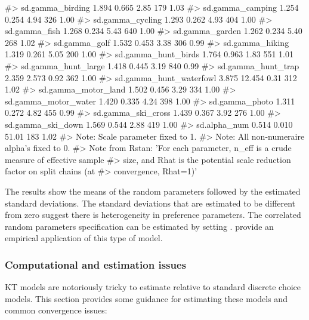 \begin{example}
#> sd.gamma_birding           1.894   0.665   2.85   179 1.03
#> sd.gamma_camping           1.254   0.254   4.94   326 1.00
#> sd.gamma_cycling           1.293   0.262   4.93   404 1.00
#> sd.gamma_fish              1.268   0.234   5.43   640 1.00
#> sd.gamma_garden            1.262   0.234   5.40   268 1.02
#> sd.gamma_golf              1.532   0.453   3.38   306 0.99
#> sd.gamma_hiking            1.319   0.261   5.05   200 1.00
#> sd.gamma_hunt_birds        1.764   0.963   1.83   551 1.01
#> sd.gamma_hunt_large        1.418   0.445   3.19   840 0.99
#> sd.gamma_hunt_trap         2.359   2.573   0.92   362 1.00
#> sd.gamma_hunt_waterfowl    3.875  12.454   0.31   312 1.02
#> sd.gamma_motor_land        1.502   0.456   3.29   334 1.00
#> sd.gamma_motor_water       1.420   0.335   4.24   398 1.00
#> sd.gamma_photo             1.311   0.272   4.82   455 0.99
#> sd.gamma_ski_cross         1.439   0.367   3.92   276 1.00
#> sd.gamma_ski_down          1.569   0.544   2.88   419 1.00
#> sd.alpha_num               0.514   0.010  51.01   183 1.02
#> Note: Scale parameter fixed to 1. 
#> Note: All non-numeraire alpha's fixed to 0. 
#> Note from Rstan: 'For each parameter, n_eff is a crude measure of effective sample 
#> size, and Rhat is the potential scale reduction factor on split chains (at 
#> convergence, Rhat=1)'
\end{example}

The results show the means of the random parameters followed by the
estimated standard deviations. The standard deviations that are
estimated to be different from zero suggest there is heterogeneity in
preference parameters. The correlated random parameters specification
can be estimated by setting .
\citet{bhathousehold2006} provide an empirical application of this type
of model.

\hypertarget{computational-and-estimation-issues}{%
\subsubsection{Computational and estimation
issues}\label{computational-and-estimation-issues}}

KT models are notoriously tricky to estimate relative to standard
discrete choice models. This section provides some guidance for
estimating these models and common convergence issues:

